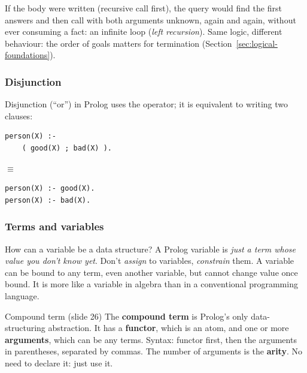 \begin{nbwarning}
If the body were written  (recursive call first), the
query  would find the first answers and then call
 with both arguments unknown, again and again, without ever consuming a
 fact: an infinite loop (\emph{left recursion}). Same logic, different
behaviour: the order of goals matters for termination (Section~\ref{sec:logical-foundations}).
\end{nbwarning}

\subsubsection{Disjunction}

Disjunction (``or'') in Prolog uses the \code{;} operator; it is equivalent to writing two
clauses:
\begin{center}
\begin{minipage}{0.42\linewidth}
\begin{verbatim}
person(X) :-
    ( good(X) ; bad(X) ).
\end{verbatim}
\end{minipage}
\quad$\equiv$\quad
\begin{minipage}{0.42\linewidth}
\begin{verbatim}
person(X) :- good(X).
person(X) :- bad(X).
\end{verbatim}
\end{minipage}
\end{center}

\subsubsection{Terms and variables}

How can a variable be a data structure? A Prolog variable is \emph{just a term whose value
you don't know yet}. Don't \emph{assign} to variables, \emph{constrain} them. A variable can
be bound to any term, even another variable, but cannot change value once bound. It is
more like a variable in algebra than in a conventional programming language.

\begin{nbdef}{Compound term (slide 26)}
The \textbf{compound term} is Prolog's only data-structuring abstraction. It has a
\textbf{functor}, which is an atom, and one or more \textbf{arguments}, which can be any
terms. Syntax: functor first, then the arguments in parentheses, separated by commas. The
number of arguments is the \textbf{arity}. No need to declare it: just use it.
\end{nbdef}


